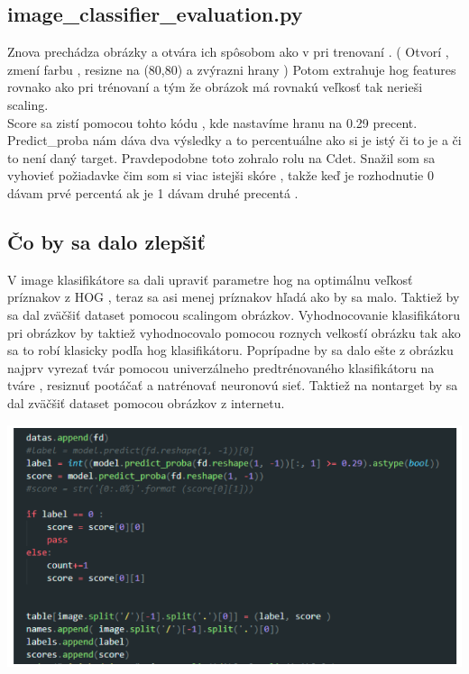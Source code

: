 \documentclass{article}
\begin{document}
\subsection{image\_classifier\_evaluation.py}
\begin{flushleft}
\Large{
Znova prechádza  obrázky a otvára ich spôsobom ako v pri trenovaní . ( Otvorí , zmení farbu , resizne na (80,80) a zvýrazni hrany ) Potom extrahuje hog features rovnako ako pri trénovaní a tým že obrázok má rovnakú veľkosť tak nerieši scaling. \\

Score sa zistí pomocou  tohto kódu , kde nastavíme hranu na 0.29 precent. Predict\_proba nám dáva dva výsledky a to percentuálne ako si je istý či to je a či to není daný target.  Pravdepodobne toto zohralo rolu na Cdet.  Snažil som sa vyhovieť požiadavke čim som si viac istejši skóre  , takže keď je rozhodnutie 0 dávam prvé percentá ak je 1 dávam druhé precentá .
}
\subsection{Čo by sa dalo zlepšiť}
\Large{V image klasifikátore sa dali upraviť parametre hog na optimálnu veľkosť príznakov z HOG , teraz sa asi menej príznakov hľadá ako by sa malo. Taktiež by sa dal zväčšiť dataset  pomocou scalingom obrázkov. Vyhodnocovanie klasifikátoru pri obrázkov by taktiež vyhodnocovalo pomocou roznych velkosťí obrázku tak ako sa to robí klasicky podľa hog klasifikátoru. Poprípadne by sa dalo ešte z obrázku najprv vyrezať tvár pomocou univerzálneho predtrénovaného klasifikátoru na tváre , resiznuť pootáčať a natrénovať neuronovú sieť.  Taktiež na nontarget by sa dal zväčšiť dataset pomocou obrázkov z internetu. }
\end{flushleft}
\center\includegraphics[width=0.9\linewidth]{./image8.png}\\
\newpage
\end{document}
